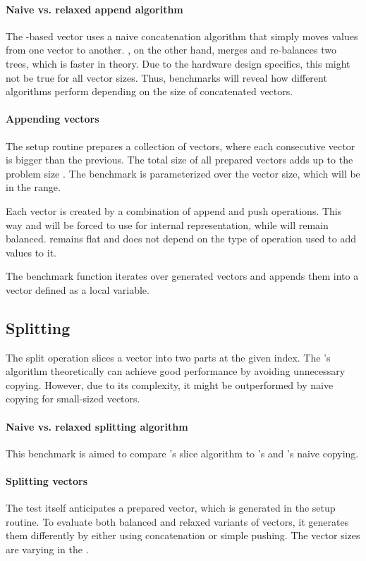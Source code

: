 \paragraph{Naive vs. relaxed append algorithm}
The \rbtree{}-based vector uses a naive concatenation algorithm that simply moves values from one vector to another. \rrbtree{}, on the other hand, merges and re-balances two trees, which is faster in theory. Due to the hardware design specifics, this might not be true for all vector sizes. Thus, benchmarks will reveal how different algorithms perform depending on the size of concatenated vectors.

\paragraph{Appending vectors}
The setup routine prepares a collection of vectors, where each consecutive vector is bigger than the previous. The total size of all prepared vectors adds up to the problem size \n{}. The benchmark is parameterized over the vector size, which will be in the \range{[20, \mega{1}]} range.

Each vector is created by a combination of append and push operations. This way \pvec{} and \rrbvec{} will be forced to use \rrbtree{} for internal representation, while \rbvec{} will remain balanced. \stdvec{} remains flat and does not depend on the type of operation used to add values to it.

The benchmark function iterates over generated vectors and appends them into a vector defined as a local variable.

\subsection{Splitting}
The split operation slices a vector into two parts at the given index. The \rrbtree{}'s algorithm theoretically can achieve good performance by avoiding unnecessary copying. However, due to its complexity, it might be outperformed by naive copying for small-sized vectors.

\paragraph{Naive vs. relaxed splitting algorithm}
This benchmark is aimed to compare \rrbvec{}'s slice algorithm to \stdvec{}'s and \rbvec{}'s naive copying.

\paragraph{Splitting vectors}
The test itself anticipates a prepared vector, which is generated in the setup routine. To evaluate both balanced and relaxed variants of vectors, it generates them differently by either using concatenation or simple pushing. The vector sizes are varying in the \range{[128, \kilo{40}]}.

